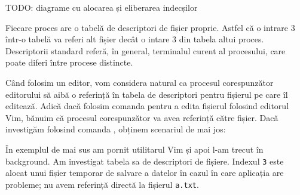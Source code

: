 %        
%
%        
TODO: diagrame cu alocarea și eliberarea indecșilor

Fiecare proces are o tabelă de descriptori de fișier proprie. Astfel că o
intrare 3 într-o tabelă va referi alt fișier decât o intare 3 din tabela altui
proces. Descriptorii standard referă, în general, terminalul curent al
procesului, care poate diferi între procese distincte.

Când folosim un editor, vom considera natural ca procesul corespunzător
editorului să aibă o referință în tabela de descriptori pentru fișierul pe care
îl editează. Adică dacă folosim comanda  pentru a edita fișierul
 folosind editorul Vim, bănuim că procesul corespunzător va avea
referință către fișier. Dacă investigăm folosind comanda , obținem scenariul
de mai jos:


În exemplul de mai sus am pornit utilitarul Vim și apoi l-am trecut în background. Am investigat tabela sa de descriptori de fișiere. Indexul \texttt{3} este alocat unui fișier temporar de salvare a datelor în cazul în care aplicația are probleme; nu avem referință directă la fișierul \texttt{a.txt}.

